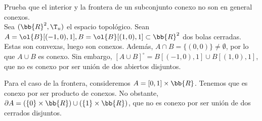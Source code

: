 \begin{ejercicio}
    Prueba que el interior y la frontera de un subconjunto conexo no son en general conexos.\\

    Sea $(\bb{R}^2,\T_u)$ el espacio topológico. Sean $A=\ol{B}[(-1,0), 1], B=\ol{B}[(1,0), 1]\subset \bb{R}^2$ dos bolas cerradas. Estas son convexas, luego son conexos. Además, $A\cap B=\{(0,0)\}\neq \emptyset$, por lo que
    $A\cup B$ es conexo. Sin embargo, $[A\cup B]^\circ=B[(-1,0),1] \cup B[(1,0),1]$, que no es conexo por ser unión de dos abiertos disjuntos.

    Para el caso de la frontera, consideremos $A=[0,1]\times \bb{R}$. Tenemos que es conexo por ser producto de conexos.
    No obstante, $\partial A = (\{0\}\times \bb{R}) \cup (\{1\}\times \bb{R})$, que no es conexo por ser unión de dos cerrados disjuntos.


\end{ejercicio}

